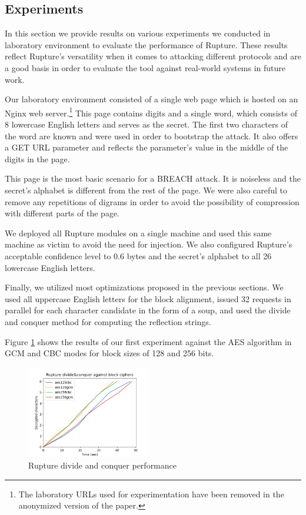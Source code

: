 \subsection{Experiments}\label{subsec:rupture_experiments}

In this section we provide results on various experiments we conducted in
laboratory environment to evaluate the performance of Rupture. These results
reflect Rupture's versatility when it comes to attacking different protocols and
are a good basis in order to evaluate the tool against real-world systems in
future work.

Our laboratory environment consisted of a single web page which is hosted on an
Nginx web server.\footnote[2]{The laboratory URLs used for experimentation have
been removed in the anonymized version of the paper.} This page contains digits
and a single word, which consists of 8 lowercase English letters and serves as
the secret. The first two characters of the word are known and were used in
order to bootstrap the attack. It also offers a GET URL parameter and reflects
the parameter's value in the middle of the digits in the page.

This page is the most basic scenario for a BREACH attack. It is noiseless and
the secret's alphabet is different from the rest of the page. We were also
careful to remove any repetitions of digrams in order to avoid the possibility
of compression with different parts of the page.

We deployed all Rupture modules on a single machine and used this same machine
as victim to avoid the need for injection. We also configured Rupture's
acceptable confidence level to 0.6 bytes and the secret's alphabet to all 26
lowercase English letters.

Finally, we utilized most optimizations proposed in the previous sections. We
used all uppercase English letters for the block alignment, issued 32 requests
in parallel for each character candidate in the form of a soup, and used the
divide and conquer method for computing the reflection strings.

Figure \ref{fig:rupture_performance_div_conq} shows the results of our first
experiment against the AES algorithm in GCM and CBC modes for block sizes of
128 and 256 bits.

   \begin{figure}[thpb]
      \centering
          \includegraphics[width=0.48\textwidth]{experiments/rupture_performance/rupture_div_conq_performance.png}
       \caption{Rupture divide and conquer performance}
      \label{fig:rupture_performance_div_conq}
   \end{figure}


